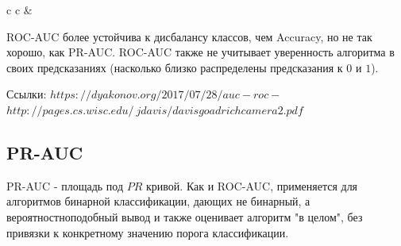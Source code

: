 \begin{tabular}{ c c }
    & 
\end{tabular}

ROC-AUC более устойчива к дисбалансу классов, чем Accuracy, но не так хорошо, как PR-AUC. ROC-AUC также не учитывает уверенность алгоритма в своих предсказаниях (насколько близко распределены предсказания к $0$ и $1$).

Ссылки:
$https://dyakonov.org/2017/07/28/auc-roc-%
$
$http://pages.cs.wisc.edu/~jdavis/davisgoadrichcamera2.pdf$


\subsection{PR-AUC}

PR-AUC - площадь под $PR$ кривой. Как и ROC-AUC, применяется для алгоритмов бинарной классификации, дающих не бинарный, а вероятностноподобный вывод и также оценивает алгоритм "в целом", без привязки к конкретному значению порога классификации.

